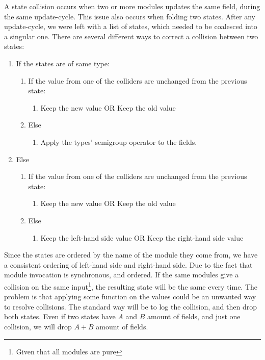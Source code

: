 A state collision occurs when two or more modules updates the same field, during
the same update-cycle. This issue also occurs when folding two states. After any
update-cycle, we were left with a list of states, which needed to be coalesced
into a singular one. There are several different ways to correct a collision
between two states:

\begin{enumerate}
  \item If the states are of same type:
    \begin{enumerate}
      \item If the value from one of the colliders are unchanged from the previous state:
        \begin{enumerate}
          \item Keep the new value OR Keep the old value
        \end{enumerate}
      \item Else
        \begin{enumerate}
          \item Apply the types' semigroup operator to the fields.
        \end{enumerate}
    \end{enumerate}
  \item Else
    \begin{enumerate}
      \item If the value from one of the colliders are unchanged from the previous state:
        \begin{enumerate}
          \item Keep the new value OR Keep the old value
        \end{enumerate}
      \item Else
        \begin{enumerate}
          \item Keep the left-hand side value OR Keep the right-hand side value
        \end{enumerate}
    \end{enumerate}
\end{enumerate}

Since the states are ordered by the name of the module they come from, we
have a consistent ordering of left-hand side and right-hand side. Due to the
fact that module invocation is synchronous, and ordered. If the same modules
give a collision on the same input\footnote{Given that all modules are pure}, the
resulting state will be the same every time. The problem is that applying some
function on the values could be an unwanted way to resolve collisions. The
standard way will be to log the collision, and then drop both states. Even
if two states have $A$ and $B$ amount of fields, and just one collision, we will
drop $A + B$ amount of fields.

